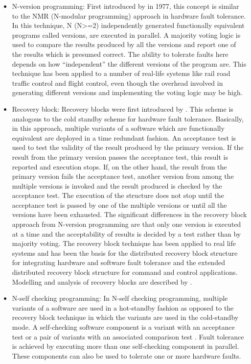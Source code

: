 \documentclass[a4paper, 11pt]{article}
\begin{document}
\begin{itemize}
\item N-version programming: First introduced by \citet{avizienis1977implementation} in 1977, this concept is similar to the NMR (N-modular programming) approach in hardware fault tolerance. In this technique, N (N>=2) independently generated functionally equivalent programs called versions, are executed in parallel. A majority voting logic is used to compare the results produced by all the versions and report one of the results which is presumed correct. The ability to tolerate faults here depends on how ``independent'' the different versions of the program are. This technique has been applied to a number of real-life systems like rail road traffic control and flight control, even though the overhead involved in generating different versions and implementing the voting logic may be high.
\item Recovery block: Recovery blocks were first introduced by \citet{horning1974program}. This scheme is analogous to the cold standby scheme for hardware fault tolerance. Basically, in this approach, multiple variants of a software which are functionally equivalent are deployed in a time redundant fashion. An acceptance test is used to test the validity of the result produced by the primary version. If the result from the primary version passes the acceptance test, this result is reported and execution stops. If, on the other hand, the result from the primary version fails the acceptance test, another version from among the multiple versions is invoked and the result produced is checked by the acceptance test. The execution of the structure does not stop until the acceptance test is passed by one of the multiple versions or until all the versions have been exhausted. The significant differences in the recovery block approach from N-version programming are that only one version is executed at a time and the acceptability of results is decided by a test rather than by majority voting. The recovery block technique has been applied to real life systems and has been the basis for the distributed recovery block structure for integrating hardware and software fault tolerance and the extended distributed recovery block structure for command and control applications. Modelling and analysis of recovery blocks are described by \citet{tomek1993modeling, lyu1995software}.
\item N-self checking programming: In N-self checking programming, multiple variants of a software are used in a hot-standby fashion as opposed to the recovery block technique in which the variants are used in the cold-standby mode. A self-checking software component is a variant with an acceptance test or a pair of variants with an associated comparison test \citep{laprie1990definition}. Fault tolerance is achieved by executing more than one self-checking component in parallel. These components can also be used to tolerate one or more hardware faults.
\end{itemize}
\end{document}
